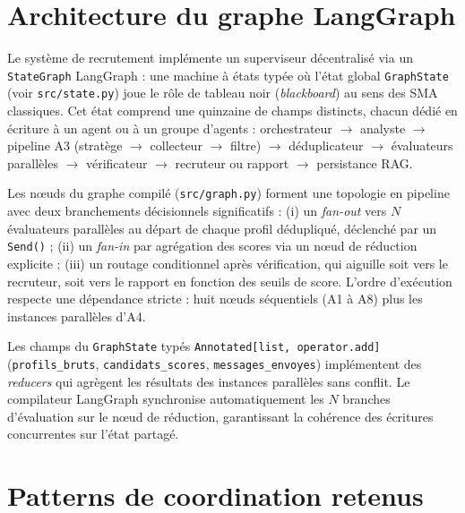 
\section{Architecture du graphe LangGraph}

Le système de recrutement implémente un superviseur décentralisé via un \texttt{StateGraph} LangGraph : une machine à états typée où l'état global \texttt{GraphState} (voir \texttt{src/state.py}) joue le rôle de tableau noir (\textit{blackboard}) au sens des SMA classiques. Cet état comprend une quinzaine de champs distincts, chacun dédié en écriture à un agent ou à un groupe d'agents : orchestrateur \(\rightarrow\) analyste \(\rightarrow\) pipeline A3 (stratège \(\rightarrow\) collecteur \(\rightarrow\) filtre) \(\rightarrow\) déduplicateur \(\rightarrow\) évaluateurs parallèles \(\rightarrow\) vérificateur \(\rightarrow\) recruteur ou rapport \(\rightarrow\) persistance RAG.

Les nœuds du graphe compilé (\texttt{src/graph.py}) forment une topologie en pipeline avec deux branchements décisionnels significatifs : (i) un \textit{fan-out} vers $N$ évaluateurs parallèles au départ de chaque profil dédupliqué, déclenché par un \texttt{Send()} ; (ii) un \textit{fan-in} par agrégation des scores via un nœud de réduction explicite ; (iii) un routage conditionnel après vérification, qui aiguille soit vers le recruteur, soit vers le rapport en fonction des seuils de score. L'ordre d'exécution respecte une dépendance stricte : huit nœuds séquentiels (A1 à A8) plus les instances parallèles d'A4.

Les champs du \texttt{GraphState} typés \texttt{Annotated[list, operator.add]} (\texttt{profils\_bruts}, \texttt{candidats\_scores}, \texttt{messages\_envoyes}) implémentent des \textit{reducers} qui agrègent les résultats des instances parallèles sans conflit. Le compilateur LangGraph synchronise automatiquement les $N$ branches d'évaluation sur le nœud de réduction, garantissant la cohérence des écritures concurrentes sur l'état partagé.

\section{Patterns de coordination retenus}

